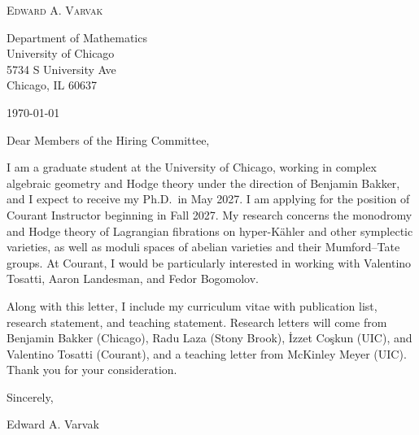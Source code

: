 \documentclass[12pt]{article}
\begin{document}
\begin{center}
  {\Large\textsc{Edward A. Varvak}}\\[10pt]
\end{center}

Department of Mathematics \\
University of Chicago \\
5734 S University Ave \\
Chicago, IL 60637

\today

Dear Members of the Hiring Committee,

I am a graduate student at the University of Chicago, working in complex
algebraic geometry and Hodge theory under the direction of Benjamin Bakker,
and I expect to receive my Ph.D.\ in May 2027. I am applying for the position
of Courant Instructor beginning in Fall 2027. My research concerns the
monodromy and Hodge theory of Lagrangian fibrations on hyper-K\"ahler and
other symplectic varieties, as well as moduli spaces of abelian varieties and
their Mumford--Tate groups. At Courant, I would be particularly interested in
working with Valentino Tosatti, Aaron Landesman, and Fedor Bogomolov.

Along with this letter, I include my curriculum vitae with publication list,
research statement, and teaching statement. Research letters will come from
Benjamin Bakker (Chicago), Radu Laza (Stony Brook), \.{I}zzet Co\c{s}kun
(UIC), and Valentino Tosatti (Courant), and a teaching letter from McKinley
Meyer (UIC). Thank you for your consideration.

Sincerely,

Edward A. Varvak
\end{document}
